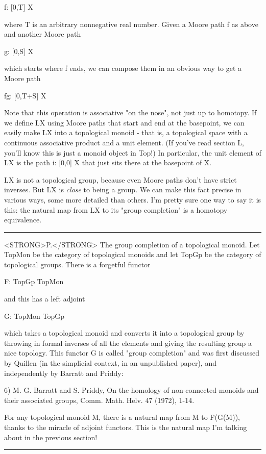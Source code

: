 f: [0,T] \to  X

where T is an arbitrary nonnegative real number.  Given a Moore path
f as above and another Moore path

g: [0,S] \to  X

which starts where f ends, we can compose them in an obvious way to
get a Moore path

fg: [0,T+S] \to  X

Note that this operation is associative "on the nose", not just up to
homotopy.  If we define LX using Moore paths that start and end at the
basepoint, we can easily make LX into a topological monoid - that is,
a topological space with a continuous associative product and a unit
element.  (If you've read section L, you'll know this is just a monoid
object in Top!)  In particular, the unit element of LX is the path 
i: [0,0] \to  X that just sits there at the basepoint of X.

LX is not a topological group, because even Moore paths don't have
strict inverses.  But LX is \emph{close} to being a group.  We can make
this fact precise in various ways, some more detailed than others.
I'm pretty sure one way to say it is this: the natural map from LX to
its "group completion" is a homotopy equivalence.

\par\noindent\rule{\textwidth}{0.4pt}
<STRONG>P.</STRONG>  The group completion of a topological monoid.  Let TopMon be the
category of topological monoids and let TopGp be the category of
topological groups.  There is a forgetful functor

F: TopGp \to  TopMon

and this has a left adjoint

G: TopMon \to  TopGp

which takes a topological monoid and converts it into a topological
group by throwing in formal inverses of all the elements and giving
the resulting group a nice topology.  This functor G is called "group
completion" and was first discussed by Quillen (in the simplicial
context, in an unpublished paper), and independently by Barratt and
Priddy:

6) M. G. Barratt and S. Priddy, On the homology of non-connected
monoids and their associated groups, Comm. Math. Helv. 47 (1972),
1-14.

For any topological monoid M, there is a natural map from M to
F(G(M)), thanks to the miracle of adjoint functors.  This is the
natural map I'm talking about in the previous section!






\par\noindent\rule{\textwidth}{0.4pt}
